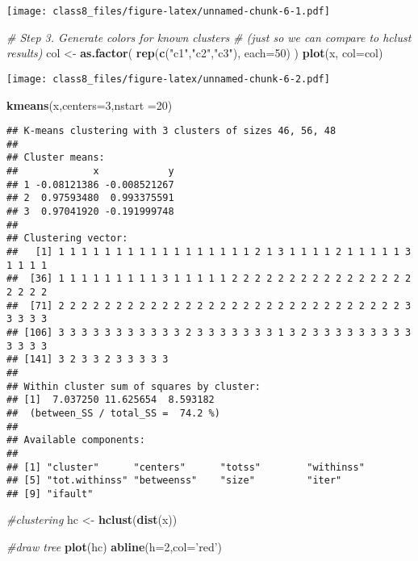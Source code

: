 \documentclass[]{article}
\newenvironment{Shaded}{\begin{snugshade}}{\end{snugshade}}
\newcommand{\KeywordTok}[1]{\textcolor[rgb]{0.13,0.29,0.53}{\textbf{#1}}}
\newcommand{\DataTypeTok}[1]{\textcolor[rgb]{0.13,0.29,0.53}{#1}}
\newcommand{\DecValTok}[1]{\textcolor[rgb]{0.00,0.00,0.81}{#1}}
\newcommand{\StringTok}[1]{\textcolor[rgb]{0.31,0.60,0.02}{#1}}
\newcommand{\CommentTok}[1]{\textcolor[rgb]{0.56,0.35,0.01}{\textit{#1}}}
\newcommand{\NormalTok}[1]{#1}
\begin{document}
\texttt{[image: class8\_files/figure-latex/unnamed-chunk-6-1.pdf]}

\begin{Shaded}
\begin{Highlighting}[]
\CommentTok{# Step 3. Generate colors for known clusters}
\CommentTok{#         (just so we can compare to hclust results)}
\NormalTok{col <-}\StringTok{ }\KeywordTok{as.factor}\NormalTok{( }\KeywordTok{rep}\NormalTok{(}\KeywordTok{c}\NormalTok{(}\StringTok{"c1"}\NormalTok{,}\StringTok{"c2"}\NormalTok{,}\StringTok{"c3"}\NormalTok{), }\DataTypeTok{each=}\DecValTok{50}\NormalTok{) )}
\KeywordTok{plot}\NormalTok{(x, }\DataTypeTok{col=}\NormalTok{col)}
\end{Highlighting}
\end{Shaded}

\texttt{[image: class8\_files/figure-latex/unnamed-chunk-6-2.pdf]}

\begin{Shaded}
\begin{Highlighting}[]
\KeywordTok{kmeans}\NormalTok{(x,}\DataTypeTok{centers=}\DecValTok{3}\NormalTok{,}\DataTypeTok{nstart =}\DecValTok{20}\NormalTok{)}
\end{Highlighting}
\end{Shaded}

\begin{verbatim}
## K-means clustering with 3 clusters of sizes 46, 56, 48
## 
## Cluster means:
##             x            y
## 1 -0.08121386 -0.008521267
## 2  0.97593480  0.993375591
## 3  0.97041920 -0.191999748
## 
## Clustering vector:
##   [1] 1 1 1 1 1 1 1 1 1 1 1 1 1 1 1 1 1 2 1 3 1 1 1 1 2 1 1 1 1 1 3 1 1 1 1
##  [36] 1 1 1 1 1 1 1 1 1 3 1 1 1 1 1 2 2 2 2 2 2 2 2 2 2 2 2 2 2 2 2 2 2 2 2
##  [71] 2 2 2 2 2 2 2 2 2 2 2 2 2 2 2 2 2 2 2 2 2 2 2 2 2 2 2 2 2 2 3 3 3 3 3
## [106] 3 3 3 3 3 3 3 3 3 3 3 2 3 3 3 3 3 3 3 1 3 2 3 3 3 3 3 3 3 3 3 3 3 3 3
## [141] 3 2 3 3 2 3 3 3 3 3
## 
## Within cluster sum of squares by cluster:
## [1]  7.037250 11.625654  8.593182
##  (between_SS / total_SS =  74.2 %)
## 
## Available components:
## 
## [1] "cluster"      "centers"      "totss"        "withinss"    
## [5] "tot.withinss" "betweenss"    "size"         "iter"        
## [9] "ifault"
\end{verbatim}

\begin{Shaded}
\begin{Highlighting}[]
\CommentTok{#clustering}
\NormalTok{hc <-}\StringTok{ }\KeywordTok{hclust}\NormalTok{(}\KeywordTok{dist}\NormalTok{(x))}

\CommentTok{#draw tree}
\KeywordTok{plot}\NormalTok{(hc)}
\KeywordTok{abline}\NormalTok{(}\DataTypeTok{h=}\DecValTok{2}\NormalTok{,}\DataTypeTok{col=}\StringTok{'red'}\NormalTok{)}
\end{Highlighting}
\end{Shaded}
\end{document}
